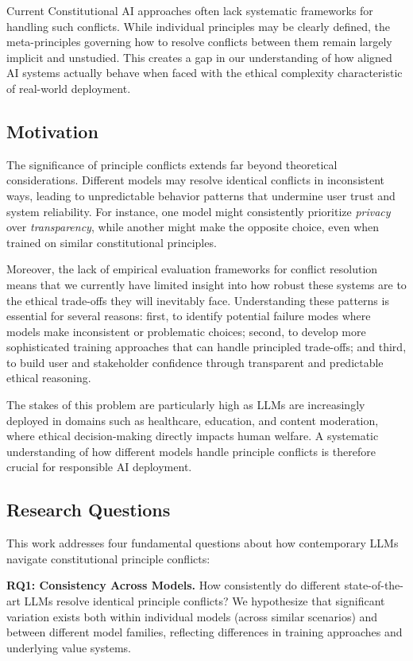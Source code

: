 \documentclass[11pt,a4paper]{article}
\newcommand{\principle}[1]{\textit{#1}}
\begin{document}
Current Constitutional AI approaches often lack systematic frameworks for handling such conflicts. While individual principles may be clearly defined, the meta-principles governing how to resolve conflicts between them remain largely implicit and unstudied. This creates a gap in our understanding of how aligned AI systems actually behave when faced with the ethical complexity characteristic of real-world deployment.

\subsection{Motivation}

The significance of principle conflicts extends far beyond theoretical considerations. Different models may resolve identical conflicts in inconsistent ways, leading to unpredictable behavior patterns that undermine user trust and system reliability. For instance, one model might consistently prioritize \principle{privacy} over \principle{transparency}, while another might make the opposite choice, even when trained on similar constitutional principles.

Moreover, the lack of empirical evaluation frameworks for conflict resolution means that we currently have limited insight into how robust these systems are to the ethical trade-offs they will inevitably face. Understanding these patterns is essential for several reasons: first, to identify potential failure modes where models make inconsistent or problematic choices; second, to develop more sophisticated training approaches that can handle principled trade-offs; and third, to build user and stakeholder confidence through transparent and predictable ethical reasoning.

The stakes of this problem are particularly high as LLMs are increasingly deployed in domains such as healthcare, education, and content moderation, where ethical decision-making directly impacts human welfare. A systematic understanding of how different models handle principle conflicts is therefore crucial for responsible AI deployment.

\subsection{Research Questions}

This work addresses four fundamental questions about how contemporary LLMs navigate constitutional principle conflicts:

\textbf{RQ1: Consistency Across Models.} How consistently do different state-of-the-art LLMs resolve identical principle conflicts? We hypothesize that significant variation exists both within individual models (across similar scenarios) and between different model families, reflecting differences in training approaches and underlying value systems.
\end{document}
